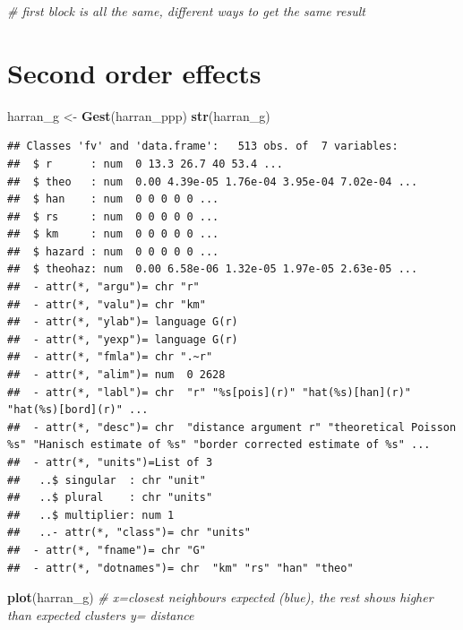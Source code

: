 \documentclass[]{article}
\newenvironment{Shaded}{\begin{snugshade}}{\end{snugshade}}
\newcommand{\KeywordTok}[1]{\textcolor[rgb]{0.13,0.29,0.53}{\textbf{{#1}}}}
\newcommand{\StringTok}[1]{\textcolor[rgb]{0.31,0.60,0.02}{{#1}}}
\newcommand{\CommentTok}[1]{\textcolor[rgb]{0.56,0.35,0.01}{\textit{{#1}}}}
\newcommand{\NormalTok}[1]{{#1}}
\begin{document}
\begin{Shaded}
\begin{Highlighting}[]
\CommentTok{# first block is all the same, different ways to get the same result}
\end{Highlighting}
\end{Shaded}

\section{Second order effects}\label{second-order-effects}

\begin{Shaded}
\begin{Highlighting}[]
\NormalTok{harran_g <-}\StringTok{ }\KeywordTok{Gest}\NormalTok{(harran_ppp)}
\KeywordTok{str}\NormalTok{(harran_g)}
\end{Highlighting}
\end{Shaded}

\begin{verbatim}
## Classes 'fv' and 'data.frame':   513 obs. of  7 variables:
##  $ r      : num  0 13.3 26.7 40 53.4 ...
##  $ theo   : num  0.00 4.39e-05 1.76e-04 3.95e-04 7.02e-04 ...
##  $ han    : num  0 0 0 0 0 ...
##  $ rs     : num  0 0 0 0 0 ...
##  $ km     : num  0 0 0 0 0 ...
##  $ hazard : num  0 0 0 0 0 ...
##  $ theohaz: num  0.00 6.58e-06 1.32e-05 1.97e-05 2.63e-05 ...
##  - attr(*, "argu")= chr "r"
##  - attr(*, "valu")= chr "km"
##  - attr(*, "ylab")= language G(r)
##  - attr(*, "yexp")= language G(r)
##  - attr(*, "fmla")= chr ".~r"
##  - attr(*, "alim")= num  0 2628
##  - attr(*, "labl")= chr  "r" "%s[pois](r)" "hat(%s)[han](r)" "hat(%s)[bord](r)" ...
##  - attr(*, "desc")= chr  "distance argument r" "theoretical Poisson %s" "Hanisch estimate of %s" "border corrected estimate of %s" ...
##  - attr(*, "units")=List of 3
##   ..$ singular  : chr "unit"
##   ..$ plural    : chr "units"
##   ..$ multiplier: num 1
##   ..- attr(*, "class")= chr "units"
##  - attr(*, "fname")= chr "G"
##  - attr(*, "dotnames")= chr  "km" "rs" "han" "theo"
\end{verbatim}

\begin{Shaded}
\begin{Highlighting}[]
\KeywordTok{plot}\NormalTok{(harran_g) }\CommentTok{# x=closest neighbours expected (blue), the rest shows higher than expected clusters y= distance}
\end{Highlighting}
\end{Shaded}
\end{document}
